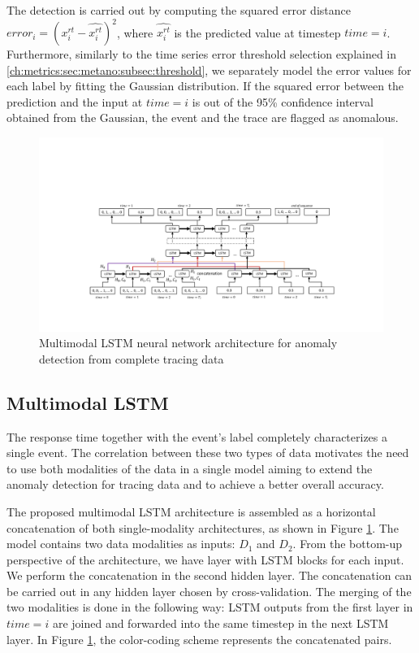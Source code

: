 The detection is carried out by computing the squared error distance $error_i = (x_{i}^{rt}-\hat{x_{i}^{rt}})^2$, where $\hat{x_{i}^{rt}}$ is the predicted value at timestep $time=i$. Furthermore, similarly to the time series error threshold selection explained in \autoref{ch:metrics:sec:metano:subsec:threshold}, we separately model the error values for each label by fitting the Gaussian distribution. If the squared error between the prediction and the input at $time=i$ is out of the 95\% confidence interval obtained from the Gaussian, the event and the trace are flagged as anomalous.

\begin{figure}[htbp]
\centerline{\includegraphics[width=1.0\textwidth]{gfx/chap5/multitasklstm.pdf}}
\caption{Multimodal LSTM neural network architecture for anomaly detection from complete tracing data}
\label{lstmmultitask}
\end{figure}

\subsection{Multimodal LSTM}\label{multimodal}
The response time together with the event's label completely characterizes a single event. The correlation between these two types of data motivates the need to use both modalities of the data in a single model aiming to extend the anomaly detection for tracing data and to achieve a better overall accuracy. 

The proposed multimodal LSTM architecture is assembled as a horizontal concatenation of both single-modality architectures, as shown in Figure \ref{lstmmultitask}. The model contains two data modalities as inputs: $D_1$ and $D_2$. From the bottom-up perspective of the architecture, we have layer with LSTM blocks for each input. We perform the concatenation in the second hidden layer. The concatenation can be carried out in any hidden layer chosen by cross-validation. The merging of the two modalities is done in the following way: LSTM outputs from the first layer in $time=i$ are joined and forwarded into the same timestep in the next LSTM layer. In Figure \ref{lstmmultitask}, the color-coding scheme represents the concatenated pairs. 

